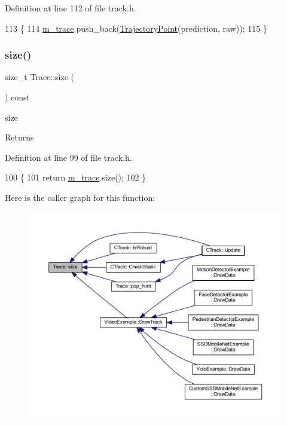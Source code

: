 Definition at line 112 of file track.\+h.


\begin{DoxyCode}
113     \{
114         \mbox{\hyperlink{class_trace_a2650850103966a19b5cbac6db8df8b66}{m\_trace}}.push\_back(\mbox{\hyperlink{struct_trajectory_point}{TrajectoryPoint}}(prediction, raw));
115     \}
\end{DoxyCode}
\mbox{\label{class_trace_a1bc7111ffb39ba415c2553677fc2f3ba}} 
\subsubsection{\texorpdfstring{size()}{size()}}
{\footnotesize\ttfamily size\+\_\+t Trace\+::size (\begin{DoxyParamCaption}{ }\end{DoxyParamCaption}) const\hspace{0.3cm}{\ttfamily [inline]}}



size 

\begin{DoxyReturn}{Returns}

\end{DoxyReturn}


Definition at line 99 of file track.\+h.


\begin{DoxyCode}
100     \{
101         \textcolor{keywordflow}{return} \mbox{\hyperlink{class_trace_a2650850103966a19b5cbac6db8df8b66}{m\_trace}}.size();
102     \}
\end{DoxyCode}
Here is the caller graph for this function\+:\nopagebreak
\begin{figure}[H]
\begin{center}
\leavevmode
\includegraphics[width=350pt]{class_trace_a1bc7111ffb39ba415c2553677fc2f3ba_icgraph}
\end{center}
\end{figure}


